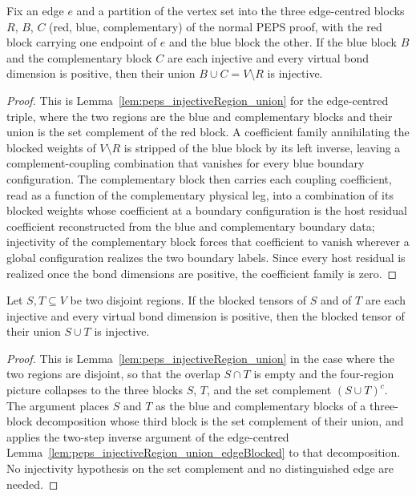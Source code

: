 \begin{lemma}%
    \label{lem:peps_injectiveRegion_union_edgeBlocked}
    \leanok
    Fix an edge $e$ and a partition of the vertex set into the three
    edge-centred blocks $R$, $B$, $C$ (red, blue, complementary) of the normal
    PEPS proof, with the red block carrying one endpoint of $e$ and the blue
    block the other. If the blue block $B$ and the complementary block $C$ are
    each injective and every virtual bond dimension is positive, then their
    union $B\cup C=V\setminus R$ is injective.
\end{lemma}
\begin{proof}\leanok
    This is Lemma~\ref{lem:peps_injectiveRegion_union} for the
    edge-centred triple, where the two regions are the blue and complementary
    blocks and their union is the set complement of the red block. A coefficient
    family annihilating the blocked weights of $V\setminus R$ is stripped of the
    blue block by its left inverse, leaving a complement-coupling combination
    that vanishes for every blue boundary configuration. The complementary block
    then carries each coupling coefficient, read as a function of the
    complementary physical leg, into a combination of its blocked weights whose
    coefficient at a boundary configuration is the host residual coefficient
    reconstructed from the blue and complementary boundary data; injectivity of
    the complementary block forces that coefficient to vanish wherever a global
    configuration realizes the two boundary labels. Since every host residual is
    realized once the bond dimensions are positive, the coefficient family is
    zero.
\end{proof}

\begin{lemma}%
    \label{lem:peps_injectiveRegion_union_disjoint}
    \leanok
    Let $S,T\subseteq V$ be two disjoint regions. If the blocked tensors of $S$
    and of $T$ are each injective and every virtual bond dimension is positive,
    then the blocked tensor of their union $S\cup T$ is injective.
\end{lemma}
\begin{proof}\leanok
    This is Lemma~\ref{lem:peps_injectiveRegion_union} in the case
    where the two regions are disjoint, so that the overlap $S\cap T$ is empty
    and the four-region picture collapses to the three blocks $S$, $T$, and the
    set complement $(S\cup T)^c$. The argument places $S$ and $T$ as the blue and
    complementary blocks of a three-block decomposition whose third block is the
    set complement of their union, and applies the two-step inverse argument of
    the edge-centred Lemma~\ref{lem:peps_injectiveRegion_union_edgeBlocked}
    to that decomposition. No injectivity hypothesis on the set complement and no
    distinguished edge are needed.
\end{proof}

